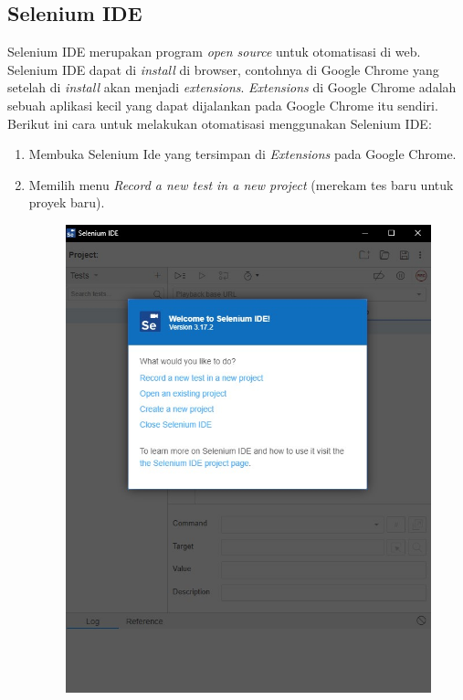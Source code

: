 \subsection{Selenium IDE}
\label{sec:seleniumIDE}  
Selenium IDE merupakan program \textit{open source} untuk otomatisasi di web. Selenium IDE dapat di \textit{install} di browser, contohnya di Google Chrome yang setelah di \textit{install} akan menjadi \textit{extensions}. \textit{Extensions} di Google Chrome adalah sebuah aplikasi kecil yang dapat dijalankan pada Google Chrome itu sendiri. Berikut ini cara untuk melakukan otomatisasi menggunakan Selenium IDE:
\begin{enumerate}
	\item Membuka Selenium Ide yang tersimpan di \textit{Extensions} pada Google Chrome.
	\item Memilih menu \textit{Record a new test in a new project} (merekam tes baru untuk proyek baru).
	\begin{figure}[H]
		\centering
		\includegraphics[scale=0.5]{Gambar/menuSeleniumIDE.jpg}

\end{figure}
\end{enumerate}
